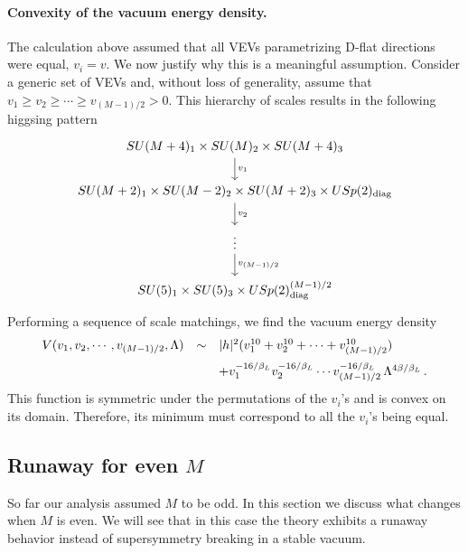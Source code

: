 \documentclass[a4paper,12pt]{article}
\begin{document}
{\paragraph{Convexity of the vacuum energy density.} 
The calculation above assumed that all VEVs parametrizing D-flat directions were equal, $v_i=v$. We now justify why this is a meaningful assumption. Consider a generic set of VEVs and, without loss of generality, assume that $v_1 \geqslant v_2 \geqslant \cdots \geqslant v_{(M-1)/2}>0$. This hierarchy of scales results in the following higgsing pattern
\[
\begin{tikzcd}
	SU(M+4)_1\times SU(M)_2 \times SU(M+4)_3 \arrow[d, "v_1"] \\
	SU(M+2)_1 \times SU(M-2)_2 \times SU(M+2)_3 \times USp(2)_\text{diag} \arrow[d, "v_2"] \\
	\vdots \arrow[d, "v_{(M-1)/2}"] \\
	SU(5)_1 \times SU(5)_3 \times USp(2)_\text{diag}^{(M-1)/2}
\end{tikzcd}
\]
Performing a sequence of scale matchings, we find the vacuum energy density
\begin{equation}
	\begin{array}{rcl}
	V(v_1, v_2, \cdots, v_{(M-1)/2}, \Lambda) &\sim& \vert h \vert^2 (v_1^{10} +v_2^{10}+ \cdots + v_{(M-1)/2}^{10} ) \vspace{0.2cm}  \\
	& & +  v_1^{-16/\beta_{L}} v_2^{-16/\beta_{L}} \cdots v_{(M-1)/2}^{-16/\beta_{L}} \, \Lambda^{4\beta / \beta_{L}} \, .	
	\end{array}
\end{equation}
This function is symmetric under the permutations of the $v_i$'s and is convex on its domain. Therefore, its minimum must correspond to all the $v_i$'s being equal.


\subsection{Runaway for even $M$}
\label{section_even_M}

So far our analysis assumed $M$ to be odd. In this section we discuss what changes when $M$ is even. We will see that in this case the theory exhibits a runaway behavior instead of supersymmetry breaking in a stable vacuum.

}
\end{document}
